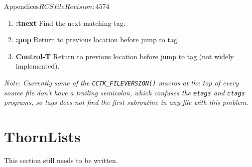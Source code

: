 \begin{cactuspart}{Appendices}{$RCSfile$}{$Revision: 4574 $}
\begin{enumerate}
\item \textbf{:tnext}
Find the next matching tag.

\item \textbf{:pop}
Return to previous location before jump to tag.

\item \textbf{Control-T}
Return to previous location before jump to tag (not widely implemented).

\end{enumerate}

\vspace{1.1cm}

\emph{Note: Currently some of the \texttt{CCTK\_FILEVERSION()} macros
at the top of every source file don't have a trailing semicolon, which
confuses the \texttt{etags} and \texttt{ctags} programs, so tags does not
find the first subroutine in any file with this problem.}


\chapter{ThornLists}

\label{chap:th}

This section still needs to be written.


\end{cactuspart}

